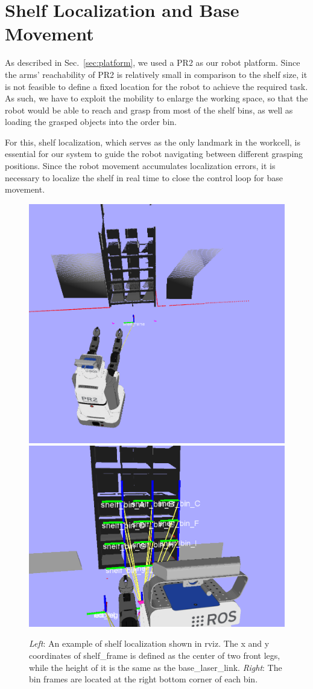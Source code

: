 \section{Shelf Localization and Base Movement}
\label{sec:shelf}

As described in Sec.~\ref{sec:platform}, we used a PR2 as our robot platform. Since the arms' reachability of PR2 is relatively small in comparison to the shelf size, it is not feasible to define a fixed location for the robot to achieve the required task. As such, we have to exploit the mobility to enlarge the working space, so that the robot would be able to reach and grasp from most of the shelf bins, as well as loading the grasped objects into the order bin.

For this, shelf localization, which serves as the only landmark in the workcell, is essential for our system to guide the robot navigating between different grasping positions. Since the robot movement accumulates localization errors, it is necessary to localize the shelf in real time to close the control loop for base movement. 

\begin{figure}[htb]
\centering
	\includegraphics[height=0.39\columnwidth]{figures/localization.png}
	\includegraphics[height=0.39\columnwidth]{figures/binFrames.png}
        \caption{\emph{Left}: An example of shelf localization shown in rviz. The x and y coordinates of shelf\_frame is defined as the center of two front legs, while the height of it is the same as the base\_laser\_link. \emph{Right}: The bin frames are located at the right bottom corner of each bin.}
        \label{fig:localization}
\end{figure}

